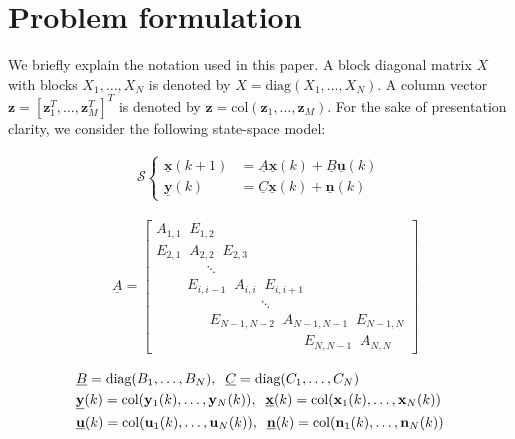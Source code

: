 \documentclass[journal,10pt]{IEEEtran}
\begin{document}
\section{Problem formulation}
\label{problemFormulation}
We briefly explain the notation used in this paper. A block diagonal matrix $X$ with blocks $X_{1},\ldots,X_{N}$ is denoted by $X=\text{diag}(X_{1},\ldots,X_{N})$. A column vector $\mathbf{z}=[\mathbf{z}_{1}^{T},\ldots, \mathbf{z}_{M}^{T}]^{T}$ is denoted by $\mathbf{z}=\text{col}(\mathbf{z}_{1},\ldots,\mathbf{z}_{M})$.
For the sake of presentation clarity, we consider the following state-space model: 
\begin{small}
\begin{align}
\mathcal{S} \left\{ \begin{array} {rl}
\underline{\mathbf{x}}(k+1)&=\underline{A}\underline{\mathbf{x}}(k)+\underline{B}\underline{\mathbf{u}}(k) \\
\underline{\mathbf{y}}(k)&=\underline{C}\underline{\mathbf{x}}(k)+\underline{\mathbf{n}}(k) \end{array} \right. \label{globalSys}
\end{align}
\end{small}
\begin{small}
\begin{align}
&\underline{A}= \left[\begin{array}{l}
 A_{1,1} \; \; E_{1,2}  \\
E_{2,1} \; \;  A_{2,2} \; \; E_{2,3}    \\
 \;\;\;\;\;\;\; \;\;\;\;\; \; \ddots   \\
 \;\;\;\;\;\;\;\; E_{i,i-1} \;\; A_{i,i}  \;\; E_{i,i+1}  \\
  \;\;\; \;\;\;\;\;\;\;\;\;\; \;\;\;\;\;\;\;\;\;\;\;\;\;\; \ddots   \\
   \;\;\;\; \;\;\;\; \;\;\;\;\;\ E_{N-1,N-2} \;\; A_{N-1,N-1}  \;\; E_{N-1,N}  \\
  \;\;\;\; \;\;\;\;\;\;\;\;\;\; \;\;\;\;\; \;\;\; \;\;\;\;\; \;\;\; \;\;\;\;\; \;\;\; E_{N,N-1} \;\;  A_{N,N} \end{array}\right]
\label{explanationGlobSys}
\end{align}
\end{small}
\begin{small}
\begin{align}
& \underline{B}= \text{diag} (B_{1},\ldots,B_{N}),\;\; 
\underline{C}= \text{diag} (C_{1},\ldots,C_{N}) \notag \\
&\underline{\mathbf{y}}(k)=\text{col}(\mathbf{y}_{1}(k),\ldots,\mathbf{y}_{N}(k))
,\;\; \underline{\mathbf{x}}(k)=\text{col}(\mathbf{x}_{1}(k),\ldots,\mathbf{x}_{N}(k))
\notag \\
&\underline{\mathbf{u}}(k)=\text{col}(\mathbf{u}_{1}(k),\ldots,\mathbf{u}_{N}(k))
,\;\;
\underline{\mathbf{n}}(k)=\text{col}(\mathbf{n}_{1}(k),\ldots,\mathbf{n}_{N}(k)) \notag
\end{align}
\end{small}
\end{document}
